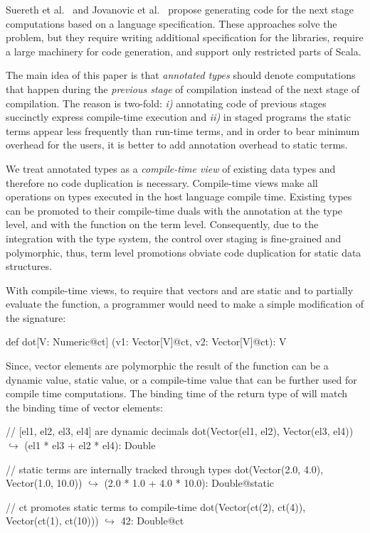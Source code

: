 Suereth et al.~\cite{forge} and Jovanovic et al.~\cite{yin-yang}
 propose generating code for the next stage computations based on
 a language specification. These approaches solve the problem,
 but they require writing additional specification for the libraries,
 require a large machinery for code generation,
 and support only restricted parts of Scala.

The main idea of this paper is that \emph{annotated types} should denote computations
 that happen during the \emph{previous stage} of compilation instead of the
 next stage of compilation. The reason is two-fold: \emph{i)} annotating code
 of previous stages succinctly express compile-time execution and \emph{ii)} in
 staged programs the static terms appear less frequently than run-time terms,
 and in order to bear minimum overhead for the users, it is better to add annotation
 overhead to static terms.

We treat annotated types as a \emph{compile-time view}
 of existing data types and therefore no code duplication is necessary.
 Compile-time views make all operations on types executed in
 the host language compile time. Existing types can be promoted
 to their compile-time duals with the  annotation at the type level,
 and with the  function on the term level. Consequently, due to the
 integration with the type system, the control over staging is
 fine-grained and polymorphic, thus, term level promotions obviate code duplication
 for static data structures.

With compile-time views, to require that vectors  and  are
 static and to partially evaluate the function, a programmer would need to make
 a simple modification of the  signature:\begin{lstparagraph}
def dot[V: Numeric@ct]
  (v1: Vector[V]@ct, v2: Vector[V]@ct): V
\end{lstparagraph}

Since, vector elements are polymorphic the result
 of the function can be a dynamic value, static value, or a compile-time value
 that can be further used for compile time computations. The binding time of the return type
 of  will match the binding time of vector elements:

\vspace{1.8mm}
\begin{listing}[mathescape]
  // [el1, el2, el3, el4] are dynamic decimals
  dot(Vector(el1, el2), Vector(el3, el4))
    $\hookrightarrow$ (el1 * el3 + el2 * el4): Double

  // static terms are internally tracked through types
  dot(Vector(2.0, 4.0), Vector(1.0, 10.0))
    $\hookrightarrow$ (2.0 * 1.0 + 4.0 * 10.0): Double@static

  // ct promotes static terms to compile-time
  dot(Vector(ct(2), ct(4)),
      Vector(ct(1), ct(10)))
    $\hookrightarrow$ 42: Double@ct
\end{listing}
\vspace{1.8mm}

